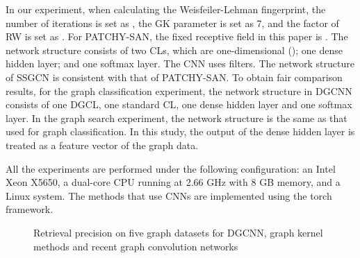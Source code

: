 \documentclass[11pt]{article}
\begin{document}
In our experiment, when calculating the Weisfeiler-Lehman fingerprint, the number of iterations is set as , the GK parameter is set as 7, and the factor of RW is set as . For PATCHY-SAN, the fixed receptive field in this paper is . The network structure consists of two CLs, which are one-dimensional (); one dense hidden layer; and one softmax layer. The CNN uses  filters. The network structure of SSGCN is consistent with that of PATCHY-SAN.
To obtain fair comparison results, for the graph classification experiment, the network structure in DGCNN consists of one DGCL, one standard CL, one dense hidden layer and one softmax layer. In the graph search experiment, the network structure is the same as that used for graph classification. In this study, the output of the dense hidden layer is treated as a feature vector of the graph data.

All the experiments are performed under the following configuration: an Intel Xeon X5650, a dual-core CPU running at 2.66 GHz  with 8 GB memory, and a Linux system. The methods that use CNNs are implemented using the torch framework.

\begin{figure}[t]
\hspace{0.6in}
\hspace{-1in}

\hspace{0.2in}

\caption{Retrieval precision on five graph datasets for DGCNN, graph kernel methods and recent graph convolution networks}\label{fig:retrieval}
\end{figure}
\end{document}
